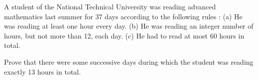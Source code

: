 A  student of the  National  Technical  University  was  reading  advanced mathematics  last summer for  37  days  according  to the following rules :
(a) He was  reading  at least  one hour  every  day.
(b) He was reading an integer  number of  hours, but not more  than 12, each day.
(c) He  had  to read at most  60  hours in total.

Prove  that there  were some  successive  days  during  which  the student was  reading  exactly 13  hours in  total.